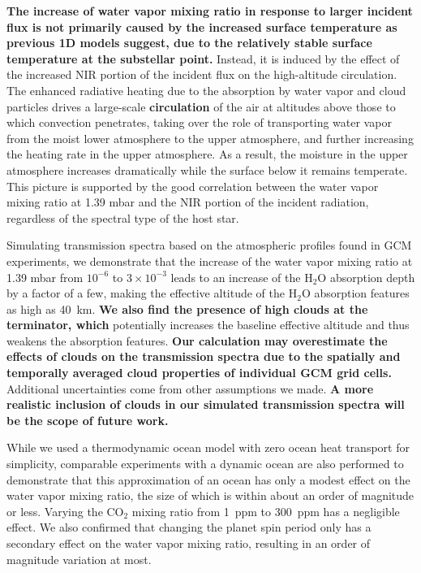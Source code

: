 \documentclass[11pt,numberedappendix,twocolappendix,]{emulateapj}
\def\water{H$_2$O}
\def\preslevel{1.39 mbar}
\def\wv{water vapor}
\def\revise#1{{\bf #1}}
\begin{document}
\revise{The increase of \wv{} mixing ratio in response to larger incident flux is not primarily caused by the increased surface temperature as previous 1D models suggest, due to the relatively stable surface temperature at the substellar point. }
Instead, it is induced by the effect of the increased NIR portion of the incident flux on the high-altitude circulation. 
The enhanced radiative heating due to the absorption by \wv{} and cloud particles drives a large-scale \revise{circulation} of the air at altitudes above those to which convection penetrates, taking over the role of transporting \wv{} from the moist lower atmosphere to the upper atmosphere, and further increasing the heating rate in the upper atmosphere.
As a result, the moisture in the upper atmosphere increases dramatically while the surface below it remains temperate. 
This picture is supported by the good correlation between the \wv{} mixing ratio at \preslevel{} and the NIR portion of the incident radiation, regardless of the spectral type of the host star. 

Simulating transmission spectra based on the atmospheric profiles found in GCM experiments, 
we demonstrate that the increase of the \wv{} mixing ratio at \preslevel{} from $10^{-6}$ to $3 \times 10^{-3}$ leads to an increase of the \water{} absorption depth by a factor of a few, making the effective altitude of the \water{} absorption features as high as 40~km. 
\revise{We also find the presence of high clouds at the terminator, which}   potentially increases the baseline effective altitude and thus weakens the absorption features. 
\revise{Our calculation may overestimate the effects of clouds on the transmission spectra due to the spatially and temporally averaged cloud properties of individual GCM grid cells.} Additional uncertainties come from other assumptions we made. 
\revise{A more realistic inclusion of clouds in our simulated transmission spectra will be the scope of future work. }

While we used a thermodynamic ocean model with zero ocean heat transport for simplicity, comparable experiments with a dynamic ocean are also performed to demonstrate that this approximation of an ocean has only a modest effect on the \wv{} mixing ratio, the size of which is within about an order of magnitude or less. 
Varying the CO$_2$ mixing ratio from 1~ppm to 300~ppm has a negligible effect. 
We also confirmed that changing the planet spin period only has a secondary effect on the \wv{} mixing ratio, resulting in an order of magnitude variation at most. 
\end{document}
